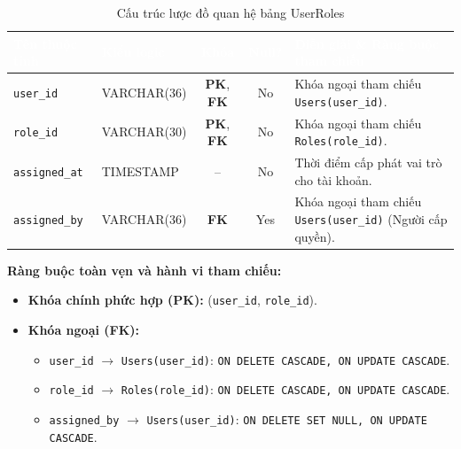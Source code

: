 \begin{table}[H]
    \centering
    \small
    \renewcommand{\arraystretch}{1.2}
    \begin{tabularx}{\textwidth}{p{3.0cm} p{2.6cm} c c X}
        \toprule
        \rowcolor{tableheader}\textcolor{white}{\textbf{Tên thuộc tính}} & \textcolor{white}{\textbf{Kiểu logic}} & \textcolor{white}{\textbf{Khóa}} & \textcolor{white}{\textbf{Null?}} & \textcolor{white}{\textbf{Diễn giải \& Ràng buộc tham chiếu}} \\
        \midrule
        \rowcolor{tablerowalt}
        \texttt{user\_id} & VARCHAR(36) & \textcolor{pkcolor}{\textbf{PK}}, \textcolor{fkcolor}{\textbf{FK}} & No & Khóa ngoại tham chiếu \texttt{Users(user\_id)}. \\
        \texttt{role\_id} & VARCHAR(30) & \textcolor{pkcolor}{\textbf{PK}}, \textcolor{fkcolor}{\textbf{FK}} & No & Khóa ngoại tham chiếu \texttt{Roles(role\_id)}. \\
        \rowcolor{tablerowalt}
        \texttt{assigned\_at} & TIMESTAMP & -- & No & Thời điểm cấp phát vai trò cho tài khoản. \\
        \texttt{assigned\_by} & VARCHAR(36) & \textcolor{fkcolor}{\textbf{FK}} & Yes & Khóa ngoại tham chiếu \texttt{Users(user\_id)} (Người cấp quyền). \\
        \bottomrule
    \end{tabularx}
    \caption{Cấu trúc lược đồ quan hệ bảng UserRoles}
    \label{tab:schema_user_roles}
\end{table}

\noindent\textbf{Ràng buộc toàn vẹn và hành vi tham chiếu:}
\begin{itemize}[noitemsep,topsep=2pt]
    \item \textbf{Khóa chính phức hợp (PK):} (\texttt{user\_id}, \texttt{role\_id}).
    \item \textbf{Khóa ngoại (FK):}
    \begin{itemize}[noitemsep]
        \item \texttt{user\_id} $\rightarrow$ \texttt{Users(user\_id)}: \texttt{ON DELETE CASCADE, ON UPDATE CASCADE}.
        \item \texttt{role\_id} $\rightarrow$ \texttt{Roles(role\_id)}: \texttt{ON DELETE CASCADE, ON UPDATE CASCADE}.
        \item \texttt{assigned\_by} $\rightarrow$ \texttt{Users(user\_id)}: \texttt{ON DELETE SET NULL, ON UPDATE CASCADE}.
    \end{itemize}
\end{itemize}

